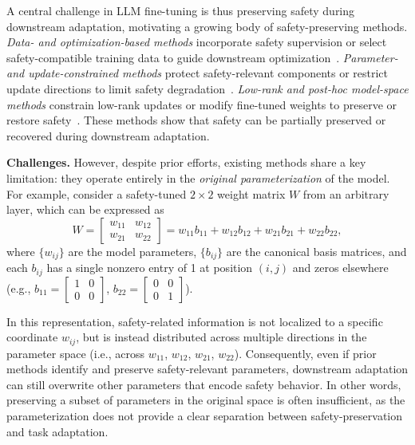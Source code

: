 \documentclass{article}
\begin{document}
A central challenge in LLM fine-tuning is thus preserving safety during downstream adaptation, motivating a growing body of safety-preserving methods. \emph{Data- and optimization-based methods} incorporate safety supervision or select safety-compatible training data to guide downstream optimization~\citep{safeInstr,lisa,seal}. \emph{Parameter- and update-constrained methods} protect safety-relevant components or restrict update directions to limit safety degradation~\citep{sn-tune,asft,safegrad}. \emph{Low-rank and post-hoc model-space methods} constrain low-rank updates or modify fine-tuned weights to preserve or restore safety~\citep{safe-lora,salora,safe-delta,Resta}. These methods show that safety can be partially preserved or recovered during downstream adaptation.%




\textbf{Challenges.} However, despite prior efforts, existing methods share a key limitation: they operate entirely in the \textit{original parameterization} of the model. For example, consider a safety-tuned $2 \times 2$ weight matrix $W$ from an arbitrary layer, which can be expressed as
\begin{equation}\label{eq:11}
W = \begin{bmatrix} w_{11} & w_{12} \\ w_{21} & w_{22} \end{bmatrix}= w_{11} b_{11}  + w_{12} b_{12} +  w_{21} b_{21} + w_{22} b_{22},
\end{equation}
where $\{w_{ij}\}$ are the model parameters, $\{b_{ij}\}$ are the canonical basis matrices, and each $b_{ij}$ has a single nonzero entry of 1 at position $(i,j)$ and zeros elsewhere (e.g., {\scriptsize $b_{11} = \begin{bmatrix} 1 & 0 \\ 0 & 0 \end{bmatrix}$}, {\scriptsize $b_{22} = \begin{bmatrix} 0 & 0 \\ 0 & 1 \end{bmatrix}$}). 


In this representation, safety-related information is not localized to a specific coordinate $w_{ij}$, but is instead distributed across multiple directions in the parameter space (i.e., across  $w_{11}$, $w_{12}$, $w_{21}$, $w_{22}$). Consequently, even if prior methods identify and preserve safety-relevant parameters, downstream adaptation can still overwrite other parameters that encode safety behavior.  In other words, preserving a subset of parameters in the original space is often insufficient, as the parameterization does not provide a clear separation between safety-preservation and task adaptation.
\end{document}
